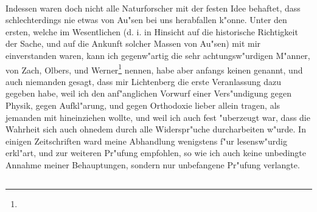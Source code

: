 \documentclass[a4paper, 11pt, oneside, polutonikogreek, german]{article}
\begin{document}
\paragraph{}
Indessen waren doch nicht alle Naturforscher mit der festen Idee behaftet, dass schlechterdings nie etwas von Au"sen bei uns herabfallen k"onne. Unter den ersten, welche im Wesentlichen (d. i. in Hinsicht auf die historische Richtigkeit der Sache, und auf die Ankunft solcher Massen von Au"sen) mit mir einverstanden waren, kann ich gegenw"artig die sehr achtungsw"urdigen M"anner, von Zach, Olbers, und Werner\footnote{} nennen, habe aber anfangs keinen genannt, und auch niemanden gesagt, dass mir Lichtenberg die erste Veranlassung dazu gegeben habe, weil ich den anf"anglichen Vorwurf einer Vers"undigung gegen Physik, gegen Aufkl"arung, und gegen Orthodoxie lieber allein tragen, als jemanden mit hineinziehen wollte, und weil ich auch fest "uberzeugt war, dass die Wahrheit sich auch ohnedem durch alle Widerspr"uche durcharbeiten w"urde. In einigen Zeitschriften ward meine Abhandlung wenigstens f"ur lesensw"urdig erkl"art, und zur weiteren Pr"ufung empfohlen, so wie ich auch keine unbedingte Annahme meiner Behauptungen, sondern nur unbefangene Pr"ufung verlangte.
\subsection{}
\end{document}
